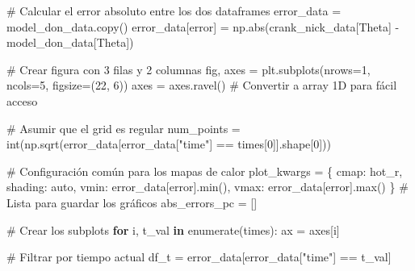 \documentclass[
  spanish,
  us-letterpaper,
  DIV=11,
  numbers=noendperiod]{scrreprt}
\newenvironment{Shaded}{\begin{snugshade}}{\end{snugshade}}
\newcommand{\BuiltInTok}[1]{\textcolor[rgb]{0.00,0.23,0.31}{#1}}
\newcommand{\CommentTok}[1]{\textcolor[rgb]{0.37,0.37,0.37}{#1}}
\newcommand{\ControlFlowTok}[1]{\textcolor[rgb]{0.00,0.23,0.31}{\textbf{#1}}}
\newcommand{\DecValTok}[1]{\textcolor[rgb]{0.68,0.00,0.00}{#1}}
\newcommand{\KeywordTok}[1]{\textcolor[rgb]{0.00,0.23,0.31}{\textbf{#1}}}
\newcommand{\NormalTok}[1]{\textcolor[rgb]{0.00,0.23,0.31}{#1}}
\newcommand{\OperatorTok}[1]{\textcolor[rgb]{0.37,0.37,0.37}{#1}}
\newcommand{\StringTok}[1]{\textcolor[rgb]{0.13,0.47,0.30}{#1}}
\theoremstyle{definition}
\theoremstyle{plain}
\theoremstyle{remark}
\begin{document}
\begin{Shaded}
\begin{Highlighting}[]
\CommentTok{\# Calcular el error absoluto entre los dos dataframes}
\NormalTok{error\_data }\OperatorTok{=}\NormalTok{ model\_don\_data.copy()}
\NormalTok{error\_data[}\StringTok{\textquotesingle{}error\textquotesingle{}}\NormalTok{] }\OperatorTok{=}\NormalTok{ np.}\BuiltInTok{abs}\NormalTok{(crank\_nick\_data[}\StringTok{\textquotesingle{}Theta\textquotesingle{}}\NormalTok{] }\OperatorTok{{-}}\NormalTok{ model\_don\_data[}\StringTok{\textquotesingle{}Theta\textquotesingle{}}\NormalTok{])}

\CommentTok{\# Crear figura con 3 filas y 2 columnas}
\NormalTok{fig, axes }\OperatorTok{=}\NormalTok{ plt.subplots(nrows}\OperatorTok{=}\DecValTok{1}\NormalTok{, ncols}\OperatorTok{=}\DecValTok{5}\NormalTok{, figsize}\OperatorTok{=}\NormalTok{(}\DecValTok{22}\NormalTok{, }\DecValTok{6}\NormalTok{))}
\NormalTok{axes }\OperatorTok{=}\NormalTok{ axes.ravel()  }\CommentTok{\# Convertir a array 1D para fácil acceso}

\CommentTok{\# Asumir que el grid es regular}
\NormalTok{num\_points }\OperatorTok{=} \BuiltInTok{int}\NormalTok{(np.sqrt(error\_data[error\_data[}\StringTok{"time"}\NormalTok{] }\OperatorTok{==}\NormalTok{ times[}\DecValTok{0}\NormalTok{]].shape[}\DecValTok{0}\NormalTok{]))}

\CommentTok{\# Configuración común para los mapas de calor}
\NormalTok{plot\_kwargs }\OperatorTok{=}\NormalTok{ \{}
    \StringTok{\textquotesingle{}cmap\textquotesingle{}}\NormalTok{: }\StringTok{\textquotesingle{}hot\_r\textquotesingle{}}\NormalTok{,}
    \StringTok{\textquotesingle{}shading\textquotesingle{}}\NormalTok{: }\StringTok{\textquotesingle{}auto\textquotesingle{}}\NormalTok{,}
    \StringTok{\textquotesingle{}vmin\textquotesingle{}}\NormalTok{: error\_data[}\StringTok{\textquotesingle{}error\textquotesingle{}}\NormalTok{].}\BuiltInTok{min}\NormalTok{(),}
    \StringTok{\textquotesingle{}vmax\textquotesingle{}}\NormalTok{: error\_data[}\StringTok{\textquotesingle{}error\textquotesingle{}}\NormalTok{].}\BuiltInTok{max}\NormalTok{()}
\NormalTok{\}}
\CommentTok{\# Lista para guardar los gráficos}
\NormalTok{abs\_errors\_pc }\OperatorTok{=}\NormalTok{ []}

\CommentTok{\# Crear los subplots}
\ControlFlowTok{for}\NormalTok{ i, t\_val }\KeywordTok{in} \BuiltInTok{enumerate}\NormalTok{(times):}
\NormalTok{    ax }\OperatorTok{=}\NormalTok{ axes[i]}
    
    \CommentTok{\# Filtrar por tiempo actual}
\NormalTok{    df\_t }\OperatorTok{=}\NormalTok{ error\_data[error\_data[}\StringTok{"time"}\NormalTok{] }\OperatorTok{==}\NormalTok{ t\_val]}
    

\end{Highlighting}
\end{Shaded}
\end{document}
